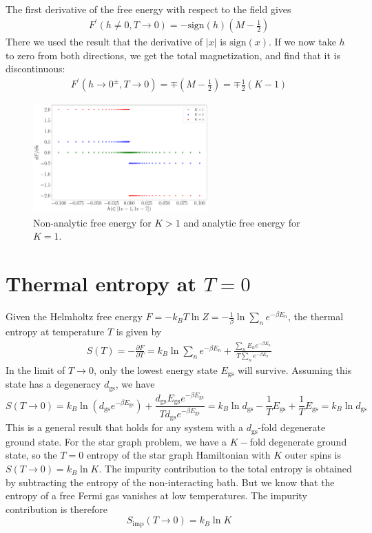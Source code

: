 \documentclass[12pt]{revtex4-2}
\begin{document}
The first derivative of the free energy with respect to the field gives
\begin{align}
	F^\prime(h\neq 0, T\to 0) = -\text{sign}(h)\left(M - \frac{1}{2}\right)
\end{align}
There we used the result that the derivative of \(|x|\) is \(\text{sign}(x)\). If we now take \(h\) to zero from both directions, we get the total magnetization, and find that it is discontinuous:
\begin{align}
	F^\prime(h \to 0^\pm, T\to 0) = \mp\left(M - \frac{1}{2}\right) = \mp \frac{1}{2}\left( K - 1 \right) 
\end{align}

\begin{figure}[htpb]
	\centering
	\includegraphics[width=0.6\textwidth]{../numerics/disc_mag_global.pdf}
	\caption{Non-analytic free energy for \(K>1\) and analytic free energy for \(K=1\).}
\end{figure}

\section{Thermal entropy at \(T=0\)}
Given the Helmholtz free energy \(F = -k_B T \ln Z = - \frac{1}{\beta} \ln\sum_n e^{-\beta E_n}\), the thermal entropy at temperature \(T\) is given by
\begin{align}
	S(T) = - \frac{\partial{F}}{\partial{T}} = k_B \ln\sum_n e^{-\beta E_n} + \frac{\sum_n E_n e^{-\beta E_n}}{T \sum_n e^{-\beta E_n}}
\end{align}
In the limit of \(T \to 0\), only the lowest energy state \(E_\text{gs}\) will survive. Assuming this state has a degeneracy \(d_\text{gs}\), we have
\begin{equation}
	S(T \to 0) = k_B \ln\left(d_\text{gs} e^{-\beta E_\text{gs}}\right) + \frac{d_\text{gs} E_\text{gs}e^{-\beta E_\text{gs}}}{T d_\text{gs} e^{-\beta E_\text{gs}}} = k_B \ln d_\text{gs} - \frac{1}{T}E_\text{gs} + \frac{1}{T}E_\text{gs} = k_B \ln d_\text{gs}
\end{equation}
This is a general result that holds for any system with a \(d_\text{gs}\)-fold degenerate ground state. For the star graph problem, we have a \(K-\)fold degenerate ground state, so the \(T=0\) entropy of the star graph Hamiltonian with \(K\) outer spins is \(S(T\to 0) = k_B \ln K\). The impurity contribution to the total entropy is obtained by subtracting the entropy of the non-interacting bath. But we know that the entropy of a free Fermi gas vanishes at low temperatures. The impurity contribution is therefore
\begin{equation}
	\label{res_entropy}
	S_\text{imp}(T\to 0) = k_B \ln K
\end{equation}
\end{document}

